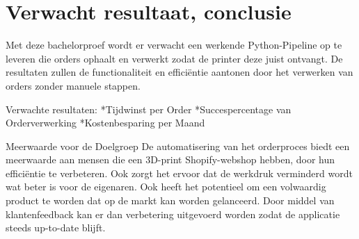 




\section{Verwacht resultaat, conclusie}%
\label{sec:verwachte_resultaten}

Met deze bachelorproef wordt er verwacht een werkende Python-Pipeline op te leveren die orders ophaalt en verwerkt zodat de printer deze juist ontvangt. De resultaten zullen de functionaliteit en efficiëntie aantonen door het verwerken van orders zonder manuele stappen.

Verwachte resultaten:
*Tijdwinst per Order
*Succespercentage van Orderverwerking
*Kostenbesparing per Maand

Meerwaarde voor de Doelgroep
De automatisering van het orderproces biedt een meerwaarde aan mensen die een 3D-print Shopify-webshop hebben, door hun efficiëntie te verbeteren. Ook zorgt het ervoor dat de werkdruk verminderd wordt wat beter is voor de eigenaren. Ook heeft het potentieel om een volwaardig product te worden dat op de markt kan worden gelanceerd. Door middel van klantenfeedback kan er dan verbetering uitgevoerd worden zodat de applicatie steeds up-to-date blijft.

